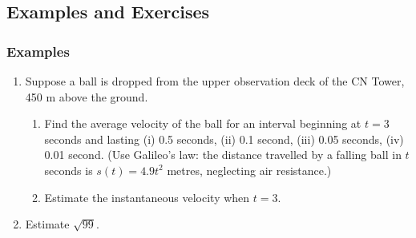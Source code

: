 \documentclass[serif,ignorenonframetext]{beamer}
\begin{document}
\begin{frame}
\begin{columns}
\begin{overlayarea}{0.29\textwidth}{3.5cm}
  \end{overlayarea}
  \end{columns}
\end{frame}

\subsection{Examples and Exercises}

\begin{frame}
  \frametitle{Examples}
  \begin{enumerate}
  \item Suppose a ball is dropped from the upper observation deck of the 
    CN Tower, 450 m above the ground.  
    \begin{enumerate}
    \item Find the average velocity of the
      ball for an interval beginning at $t=3$ seconds and lasting 
      (i) 0.5 seconds, (ii) 0.1 second, (iii) 0.05 seconds, (iv) 0.01
      second.  (Use Galileo's law: the distance travelled by a falling
      ball in $t$ seconds is $s(t) = 4.9t^2$ metres, neglecting air
      resistance.)
    \item Estimate the instantaneous velocity when $t=3$.
    \end{enumerate}
  \item Estimate $\sqrt{99}$.
  \end{enumerate}
\end{frame}
\end{document}
